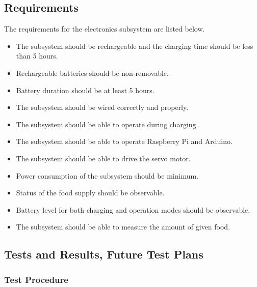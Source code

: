 \subsection{Requirements}
The requirements for the electronics subsystem are listed below.
\begin{itemize}
\item The subsystem should be rechargeable and the charging time should be less than 5 hours.
\item Rechargeable batteries should be non-removable.
\item Battery duration should be at least 5 hours.
\item The subsystem should be wired correctly and properly.
\item The subsystem should be able to operate during charging.
\item The subsystem should be able to operate Raspberry Pi and Arduino.
\item The subsystem should be able to drive the servo motor.
\item Power consumption of the subsystem should be minimum. %
\item Status of the food supply should be observable.
\item Battery level for both charging and operation modes should be observable.
\item The subsystem should be able to measure the amount of given food.

\end{itemize}




\subsection{Tests and Results, Future Test Plans}

\subsubsection{Test Procedure}
  
